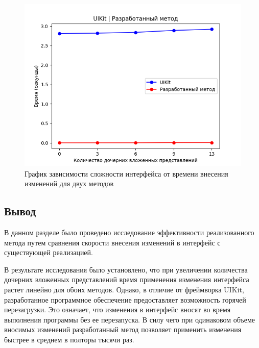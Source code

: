 \begin{figure}[!htb]
	\centering
	\includegraphics[scale=0.7]{img/chart2.png}
	\caption{График зависимости сложности интерфейса от времени внесения изменений для двух методов}
	\label{fig:chart2}
\end{figure}

\newpage
\subsection*{Вывод}
В данном разделе было проведено исследование эффективности реализованного метода путем сравнения скорости внесения изменений в интерфейс с существующей реализацией.

В результате исследования было установлено, что при увеличении количества дочерних вложенных представлений время применения изменения интерфейса растет линейно для обоих методов.
Однако, в отличие от фреймворка UIKit, разработанное программное обеспечение предоставляет возможность горячей перезагрузки.
Это означает, что изменения в интерфейс вносят во время выполнения программы без ее перезапуска. 
В силу чего при одинаковом объеме вносимых изменений разработанный метод позволяет применить изменения быстрее в среднем в полторы тысячи раз.

\pagebreak